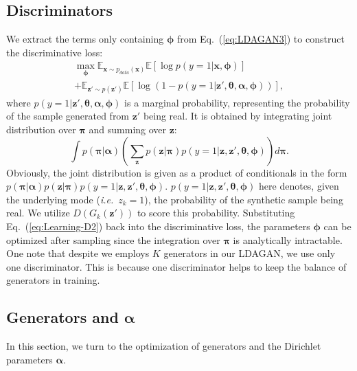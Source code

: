 \documentclass{article}
\def\ie{\emph{i.e.}}
\begin{document}
\subsection{Discriminators}
\label{sec:Discriminator}

We extract the terms only containing $\bm{\phi}$ from Eq.~(\ref{eq:LDAGAN3}) to construct the discriminative loss:
\begin{multline}
\label{eq:Learning-D1}
\max_{\bm{\phi}}
\mathbb{E}_{\mathbf{x} \sim p_{data}\left(\mathbf{x}\right)}
\mathbb{E}\left[ \log p\left( y=1 | \mathbf{x},\bm{\phi} \right) \right] \\
+\mathbb{E}_{\mathbf{z}' \sim p\left(\mathbf{z}'\right)}
\mathbb{E}\left[ \log\left( 1-p\left( y=1 | \mathbf{z}',\bm{\theta},\bm{\alpha},\bm{\phi} \right) \right) \right],
\end{multline}
where $p\left( y=1 | \mathbf{z}',\bm{\theta},\bm{\alpha},\bm{\phi} \right)$ is a marginal probability, representing the probability of the sample generated from $\mathbf{z}'$ being real.
It is obtained by integrating joint distribution over $\bm{\pi}$ and summing over $\mathbf{z}$:
\begin{equation}
\int p\left(\bm{\pi} | \bm{\alpha}\right)
\left(\sum_{\mathbf{z}}
p\left(\mathbf{z}|\bm{\pi}\right)
p\left(y=1|\mathbf{z}, \mathbf{z}', \bm{\theta}, \bm{\phi}\right)
\right)d\bm{\pi}.
\label{eq:Learning-D2}
\end{equation}
Obviously, the joint distribution is given as a product of conditionals in the form $p\left(\bm{\pi} | \bm{\alpha}\right)p\left(\mathbf{z}|\bm{\pi}\right)p\left(y=1|\mathbf{z}, \mathbf{z}', \bm{\theta}, \bm{\phi}\right)$.
$p\left(y=1|\mathbf{z}, \mathbf{z}', \bm{\theta}, \bm{\phi}\right)$ here denotes, given the underlying mode (\ie~$z_k=1$), the probability of the synthetic sample being real.
We utilize $ D\left(G_k\left(\mathbf{z}'\right)\right)$ to score this probability.
Substituting Eq.~(\ref{eq:Learning-D2}) back into the discriminative loss, the parameters $\bm{\phi}$ can be optimized after sampling since the integration over $\bm{\pi}$ is analytically intractable.
One note that despite we employs $K$ generators in our LDAGAN, we use only one discriminator.
This is because one discriminator helps to keep the balance of generators in training.

\subsection{Generators and $\bm{\alpha}$}
In this section, we turn to the optimization of generators and the Dirichlet parameters $\bm{\alpha}$.
\end{document}

